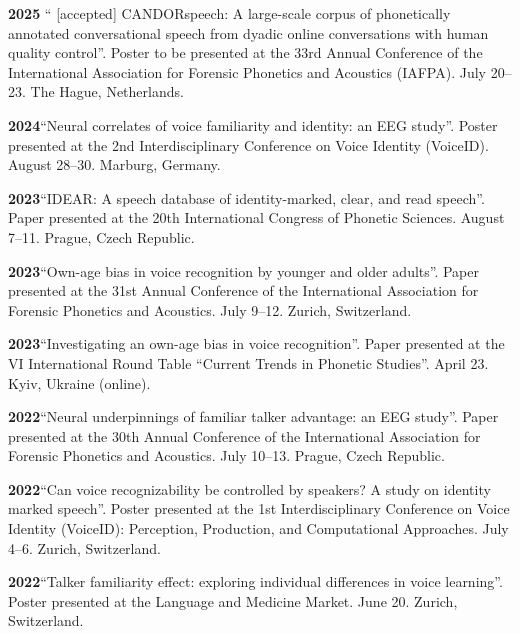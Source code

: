 \documentclass[11pt]{article}
\newcommand{\hangpara}{
 \setlength{\parindent}{0in} %
 \hangindent=0.42in %
}
\begin{document}
\vskip 6pt
\hangpara
{\bf 2025}\hspace{1ex} “ [accepted] CANDORspeech: A large-scale corpus of phonetically annotated conversational speech from dyadic online conversations with human quality control”. Poster to be presented at the 33rd Annual Conference of the International Association for Forensic Phonetics and Acoustics (IAFPA). July 20--23. The Hague, Netherlands.

\vskip 6pt
\hangpara
{\bf 2024}\hspace{1ex}“Neural correlates of voice familiarity and identity: an EEG study”. Poster presented at the 2nd Interdisciplinary Conference on Voice Identity (VoiceID). August 28--30. Marburg, Germany.


\vskip 6pt
\hangpara
{\bf 2023}\hspace{1ex}“IDEAR: A speech database of identity-marked, clear, and read speech”. Paper presented at the 20th International Congress of Phonetic Sciences. August 7--11. Prague, Czech Republic.


\vskip 6pt
\hangpara
{\bf 2023}\hspace{1ex}“Own-age bias in voice recognition by younger and older adults”. Paper presented at the 31st Annual Conference of the International Association for Forensic Phonetics and Acoustics. July 9--12. Zurich, Switzerland.


\vskip 6pt
\hangpara
{\bf 2023}\hspace{1ex}“Investigating an own-age bias in voice recognition”. Paper presented at the VI International Round Table “Current Trends in Phonetic Studies”. April 23. Kyiv, Ukraine (online).


\vskip 6pt
\hangpara
{\bf 2022}\hspace{1ex}“Neural underpinnings of familiar talker advantage: an EEG study”. Paper presented at the 30th Annual Conference of the International Association for Forensic Phonetics and Acoustics. July 10--13. Prague, Czech Republic.


\vskip 6pt
\hangpara
{\bf 2022}\hspace{1ex}“Can voice recognizability be controlled by speakers? A study on identity marked speech”. Poster presented at the 1st Interdisciplinary Conference on Voice Identity (VoiceID): Perception, Production, and Computational Approaches. July 4--6. Zurich, Switzerland.


\vskip 6pt
\hangpara
{\bf 2022}\hspace{1ex}“Talker familiarity effect: exploring individual differences in voice learning”. Poster presented at the Language and Medicine Market. June 20. Zurich, Switzerland.
\end{document}
